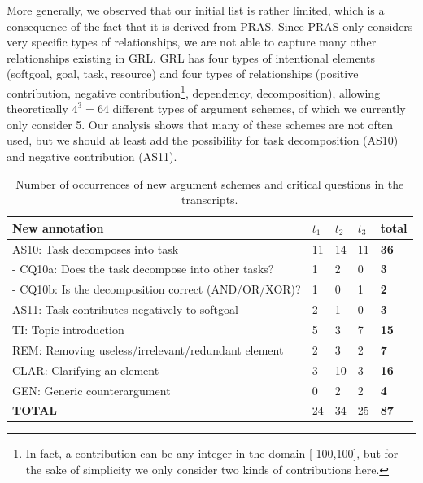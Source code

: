 \documentclass[11.5pt,two column]{llncs}
\begin{document}
More generally, we observed that our initial list is rather limited, which is a consequence of the fact that it is derived from PRAS. Since PRAS only considers very specific types of relationships, we are not able to capture many other relationships existing in GRL. GRL has four types of intentional elements (softgoal, goal, task, resource) and four types of relationships (positive contribution, negative contribution\footnote{In fact, a contribution can be any integer in the domain [-100,100], but for the sake of simplicity we only consider two kinds of contributions here.}, dependency, decomposition), allowing theoretically $4^3=64$ different types of argument schemes, of which we currently only consider 5. Our analysis shows that many of these schemes are not often used, but we should at least add the possibility for task decomposition (AS10) and negative contribution (AS11).

\begin{table}[ht]
\centering
\begin{tabular}{|l|l|l|l|>{\bfseries}l|}
\hline
\textbf{New annotation} & $t_1$ & $t_2$ & $t_3$ & \textbf{total}\\
\hline
AS10: Task decomposes into task & 11 & 14 & 11 & 36\\
\hline
- CQ10a: Does the task decompose into other tasks? & 1 &2 &0&3\\
\hline
- CQ10b: Is the decomposition correct (AND/OR/XOR)? &1 &0& 1 &2\\
\hline
AS11: Task contributes negatively to softgoal&2&1	&0&3\\
\hline
\hline
TI: Topic introduction & 5 & 3 & 7 &15\\
\hline
REM: Removing useless/irrelevant/redundant element & 2 & 3 & 2 &7\\
\hline
CLAR: Clarifying an element &3 &10 & 3 & 16\\
\hline
GEN: Generic counterargument	& 0& 2 & 2 & 4\\
\hline
\textbf{TOTAL}&24&34&25&87\\
\hline
\end{tabular}
\caption{Number of occurrences of new argument schemes and critical questions in the transcripts.}
\label{table:transcripts:results:new}
\end{table}
\end{document}
